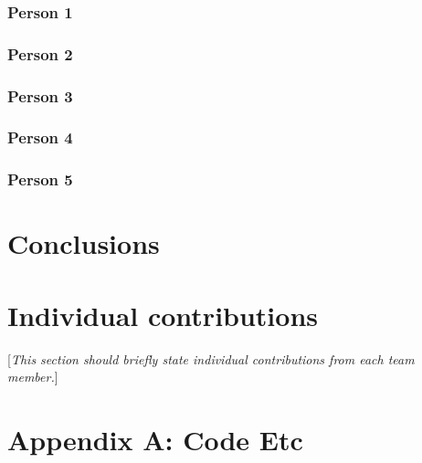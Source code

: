 \documentclass[10pt,english, openany]{book}
\begin{document}
\subsection{Person 1}
\subsection{Person 2}
\subsection{Person 3}
\subsection{Person 4}
\subsection{Person 5}

\chapter{Conclusions}

\chapter{Individual contributions}
[\textit{This section should briefly state individual contributions from each team member.}]

\pagebreak


%
%

\pagebreak

\chapter*{Appendix A: Code Etc}
\end{document}

